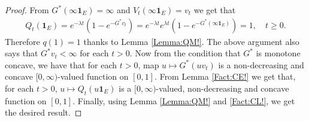 \documentclass[12pt,a4paper]{amsart}
\numberwithin{equation}{section}
\theoremstyle{plain}
\theoremstyle{definition}
\theoremstyle{remark}
\newcounter{N}
\newcounter{n}[N]
\begin{document}
\begin{proof}
From $G^*(\infty \mathbf 1_E) = \infty$ and $V_t(\infty \mathbf 1_E) = v_t$ we get that
\begin{align}
Q_t(\mathbf 1_E)
= e^{- \lambda t} ( 1-e^{-G^*v_t} )
= e^{- \lambda t} e^{\lambda t}( 1-e^{-G^*(\infty\mathbf 1_E)} )
= 1,
\quad t\geq 0.\end{align}
Therefore $q(1) = 1$ thanks to Lemma \ref{Lemma:QM!}.
The above argument also says that $G^*v_t < \infty$ for each $t>0$.
Now from the condition that $G^*$ is monotone concave, we have that for each $t>0$, map $u \mapsto G^*(uv_t)$ is a non-decreasing and concave $[0,\infty)$-valued function on $[0,1]$.
From Lemma \ref{Fact:CE!} we get that, for each $t> 0$, $u \mapsto Q_t(u \mathbf 1_E)$ is a $[0,\infty)$-valued, non-decreasing and concave function on $[0,1]$.
Finally, using Lemma \ref{Lemma:QM!} and \ref{Fact:CL!}, we get the desired result.
\end{proof}
\end{document}
